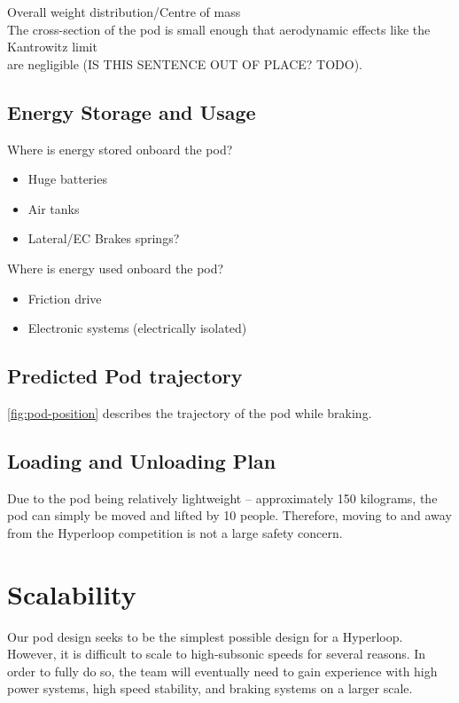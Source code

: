 \documentclass[main.tex]{subfiles}
\begin{document}
Overall weight distribution/Centre of mass\\
The cross-section of the pod is small enough that aerodynamic effects like the Kantrowitz limit\\
are negligible (IS THIS SENTENCE OUT OF PLACE? TODO).\\

\subsection{Energy Storage and Usage}
Where is energy stored onboard the pod?
\begin{itemize}
    \item Huge batteries
    \item Air tanks
    \item Lateral/EC Brakes springs?
\end{itemize}
Where is energy used onboard the pod?
\begin{itemize}
    \item Friction drive
    \item Electronic systems (electrically isolated)
\end{itemize}

\subsection{Predicted Pod trajectory}
\ref{fig:pod-position} describes the trajectory of the pod while braking.\\

\subsection{Loading and Unloading Plan}
Due to the pod being relatively lightweight – approximately 150 kilograms, the pod can simply be moved and lifted by 10 people. Therefore, moving to and away from the Hyperloop competition is not a large safety concern.

\section{Scalability}
Our pod design seeks to be the simplest possible design for a Hyperloop. However, it is difficult to scale to high-subsonic speeds for several reasons.
In order to fully do so, the team will eventually need to gain experience with high power systems, high speed stability, and braking systems on a larger scale.\\
\end{document}
